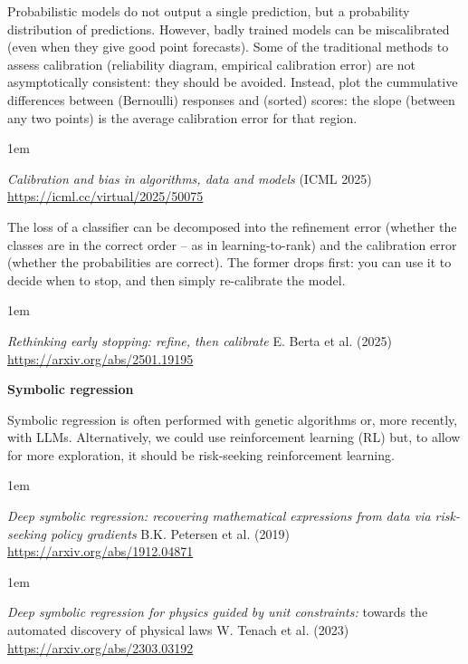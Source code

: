\documentclass[a5paper]{article}
\newenvironment{reference}{%
  \medskip\goodbreak
  \parskip 0pt
  \raggedright
  \leftskip 1em
  \obeylines
}{\par\medskip\goodbreak}
\def\subsection#1{{\par\bigskip\goodbreak\large\bfseries #1\par}}
\begin{document}
Probabilistic models do not output a single prediction,
but a probability distribution of predictions.
However, badly trained models can be miscalibrated
(even when they give good point forecasts).
Some of the traditional methods to assess calibration
(reliability diagram, empirical calibration error) are not
asymptotically consistent: they should be avoided.
Instead, plot the cummulative differences between (Bernoulli) responses and (sorted) scores:
the slope (between any two points) is the average calibration error for that region.

\begin{reference}
  \emph{Calibration and bias  in algorithms, data and models}
  (ICML 2025)
  \url{https://icml.cc/virtual/2025/50075}
\end{reference}

The loss of a classifier can be decomposed into
the refinement error (whether the classes are in the correct order -- as in learning-to-rank)
and the calibration error (whether the probabilities are correct).
The former drops first: you can use it to decide when to stop,
and then simply re-calibrate the model.

\begin{reference}
  \emph{Rethinking early stopping: refine, then calibrate}
  E. Berta et al. (2025)
  \url{https://arxiv.org/abs/2501.19195}
\end{reference}

\subsection{Symbolic regression}

Symbolic regression is often performed with genetic algorithms
or, more recently, with LLMs. Alternatively, we could use reinforcement learning (RL)
but, to allow for more exploration, it should be risk-seeking reinforcement learning.

\begin{reference}
  \emph{Deep symbolic regression:  recovering mathematical expressions from data  via risk-seeking policy gradients}
  B.K. Petersen et al. (2019)
  \url{https://arxiv.org/abs/1912.04871}
\end{reference}

\begin{reference}
  \emph{Deep symbolic regression for physics  guided by unit constraints:}
  towards  the automated discovery of physical laws
  W. Tenach et al. (2023)
  \url{https://arxiv.org/abs/2303.03192}
\end{reference}
\end{document}

